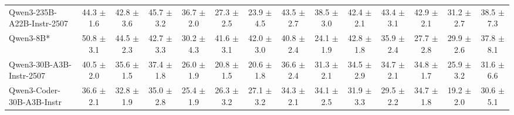 \begin{table}[hbt]
{\begin{tabular}{l *{13}{c}}
Qwen3-235B-A22B-Instr-2507 &
44.3 {\tiny$\pm$ 1.6} &
42.8 {\tiny$\pm$ 3.6} &
45.7 {\tiny$\pm$ 3.2} &
36.7 {\tiny$\pm$ 2.0} &
27.3 {\tiny$\pm$ 2.5} &
23.9 {\tiny$\pm$ 4.5} &
43.5 {\tiny$\pm$ 2.7} &
38.5 {\tiny$\pm$ 3.0} &
42.4 {\tiny$\pm$ 2.1} &
43.4 {\tiny$\pm$ 3.1} &
42.9 {\tiny$\pm$ 2.1} &
31.2 {\tiny$\pm$ 2.7} &
38.5 {\tiny$\pm$ 7.3} \\

\rowcolor{gray!10}
Qwen3-8B* &
50.8 {\tiny$\pm$ 3.1} &
44.5 {\tiny$\pm$ 2.3} &
42.7 {\tiny$\pm$ 3.3} &
30.2 {\tiny$\pm$ 4.3} &
41.6 {\tiny$\pm$ 3.1} &
42.0 {\tiny$\pm$ 3.0} &
40.8 {\tiny$\pm$ 2.4} &
24.1 {\tiny$\pm$ 1.9} &
42.8 {\tiny$\pm$ 1.8} &
35.9 {\tiny$\pm$ 2.4} &
27.7 {\tiny$\pm$ 2.8} &
29.9 {\tiny$\pm$ 2.6} &
37.8 {\tiny$\pm$ 8.1} \\

Qwen3-30B-A3B-Instr-2507 &
40.5 {\tiny$\pm$ 2.0} &
35.6 {\tiny$\pm$ 1.5} &
37.4 {\tiny$\pm$ 1.8} &
26.0 {\tiny$\pm$ 1.9} &
20.8 {\tiny$\pm$ 1.5} &
20.6 {\tiny$\pm$ 1.8} &
36.6 {\tiny$\pm$ 2.4} &
31.3 {\tiny$\pm$ 2.1} &
34.5 {\tiny$\pm$ 2.9} &
34.7 {\tiny$\pm$ 2.1} &
34.8 {\tiny$\pm$ 1.7} &
25.9 {\tiny$\pm$ 3.2} &
31.6 {\tiny$\pm$ 6.6} \\



\rowcolor{gray!10}
Qwen3-Coder-30B-A3B-Instr &
36.6 {\tiny$\pm$ 2.1} &
32.8 {\tiny$\pm$ 1.9} &
35.0 {\tiny$\pm$ 2.8} &
25.4 {\tiny$\pm$ 1.9} &
26.3 {\tiny$\pm$ 3.2} &
27.1 {\tiny$\pm$ 3.2} &
34.3 {\tiny$\pm$ 2.1} &
34.1 {\tiny$\pm$ 2.5} &
31.9 {\tiny$\pm$ 3.3} &
29.5 {\tiny$\pm$ 2.2} &
34.7 {\tiny$\pm$ 1.8} &
19.2 {\tiny$\pm$ 2.0} &
30.6 {\tiny$\pm$ 5.1} \\



\end{tabular}}
\end{table}
